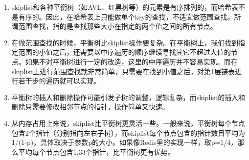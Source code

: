 \documentclass[../../../interview-questions.tex]{subfiles}
\begin{document}
\begin{enumerate}
    \item {skiplist和各种平衡树（如AVL、红黑树等）的元素是有序排列的，而哈希表不是有序的。因此，在哈希表上只能做单个key的查找，不适宜做范围查找。所谓范围查找，指的是查找那些大小在指定的两个值之间的所有节点。}
    \item {在做范围查找的时候，平衡树比skiplist操作要复杂。在平衡树上，我们找到指定范围的小值之后，还需要以中序遍历的顺序继续寻找其它不超过大值的节点。如果不对平衡树进行一定的改造，这里的中序遍历并不容易实现。而在skiplist上进行范围查找就非常简单，只需要在找到小值之后，对第1层链表进行若干步的遍历就可以实现。}
    \item {平衡树的插入和删除操作可能引发子树的调整，逻辑复杂，而skiplist的插入和删除只需要修改相邻节点的指针，操作简单又快速。}
    \item {从内存占用上来说，skiplist比平衡树更灵活一些。一般来说，平衡树每个节点包含2个指针（分别指向左右子树），而skiplist每个节点包含的指针数目平均为1/(1-p)，具体取决于参数p的大小。如果像Redis里的实现一样，取p=1/4，那么平均每个节点包含1.33个指针，比平衡树更有优势。}
\end{enumerate}
\end{document}
